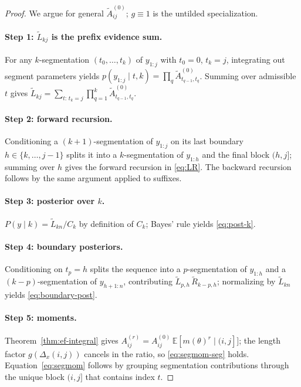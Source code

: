 \begin{proof}
We argue for general $\widetilde{A}^{(0)}_{ij}$; $g\equiv 1$ is the untilded specialization.

\paragraph{Step 1: $\widetilde{L}_{k j}$ is the prefix evidence sum.}
For any $k$-segmentation $(t_0,\dots,t_k)$ of $y_{1:j}$ with $t_0=0$, $t_k=j$, integrating out
segment parameters yields $p(y_{1:j}\mid t,k)=\prod_{q}\widetilde{A}^{(0)}_{t_{q-1},t_q}$.
Summing over admissible $t$ gives
$\widetilde{L}_{k j}=\sum_{t:\,t_k=j}\prod_{q=1}^k \widetilde{A}^{(0)}_{t_{q-1},t_q}$.

\paragraph{Step 2: forward recursion.}
Conditioning a $(k{+}1)$-segmentation of $y_{1:j}$ on its last boundary $h\in\{k,\dots,j-1\}$
splits it into a $k$-segmentation of $y_{1:h}$ and the final block $(h,j]$; summing over $h$
gives the forward recursion in \eqref{eq:LR}. The backward recursion follows by the same
argument applied to suffixes.

\paragraph{Step 3: posterior over $k$.}
$P(y\mid k)=\widetilde{L}_{k n}/C_k$ by definition of $C_k$; Bayes' rule yields \eqref{eq:post-k}.

\paragraph{Step 4: boundary posteriors.}
Conditioning on $t_p=h$ splits the sequence into a $p$-segmentation of $y_{1:h}$ and a
$(k{-}p)$-segmentation of $y_{h+1:n}$, contributing
$\widetilde{L}_{p,h}\,\widetilde{R}_{k-p,h}$; normalizing by $\widetilde{L}_{k n}$ yields
\eqref{eq:boundary-post}.

\paragraph{Step 5: moments.}
Theorem~\ref{thm:ef-integral} gives $A^{(r)}_{ij}=A^{(0)}_{ij}\,\mathbb{E}[m(\theta)^r\mid(i,j]]$;
the length factor $g(\Delta_x(i,j))$ cancels in the ratio, so \eqref{eq:segmom-seg} holds.
Equation~\eqref{eq:segmom} follows by grouping segmentation contributions through the unique
block $(i,j]$ that contains index $t$.
\end{proof}

